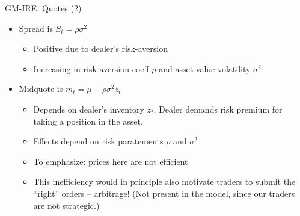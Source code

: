 \documentclass[english,10pt
,aspectratio=169
]{beamer}
\begin{document}
\begin{frame}{GM-IRE: Quotes (2)}
	\begin{itemize}
		\item \alert{Spread} is $S_t = \rho \sigma^2 $
		\begin{itemize}
			\item Positive due to dealer's risk-aversion
			\item Increasing in risk-aversion coeff $\rho$ and asset value volatility $\sigma^2$
		\end{itemize}
		\pause
		\item \alert{Midquote} is $m_t = \mu - \rho \sigma^2 z_t$
		\begin{itemize}
			\item Depends on dealer's inventory $z_t$. Dealer demands risk premium for taking a position in the asset.
			\item Effects depend on risk paratements $\rho$ and $\sigma^2$
			\item To emphasize: prices here are \alert{not efficient}
			\item This inefficiency would in principle also motivate traders to submit the ``right'' orders -- arbitrage! (Not present in the model, since our traders are not strategic.)
		\end{itemize}
	\end{itemize}
\end{frame}
\end{document}

